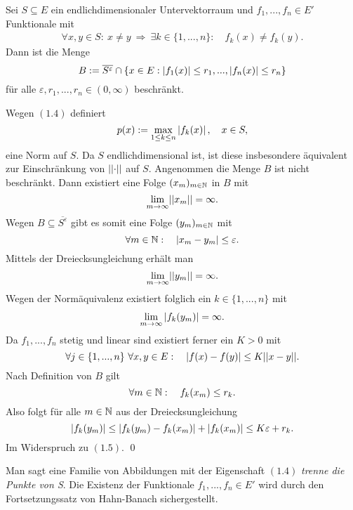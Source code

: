 \begin{lemma}
    Sei $S \subseteq E$ ein endlichdimensionaler Untervektorraum und $f_1,...,f_n \in E'$ Funktionale mit 
    \begin{align}
        \forall x,y \in S: \ x \neq y \ \Rightarrow \ \exists k \in \{1,...,n\}: \quad f_k(x) \neq f_k(y).
    \end{align}
    Dann ist die Menge 
    $$
        B := \overline{S^{\varepsilon}} \cap \{x \in E: \left| f_1(x) \right| \leq r_1,...,\left| f_n(x) \right|\leq r_n\}
    $$
    für alle $\varepsilon, r_1,...,r_n \in (0, \infty)$ beschränkt. 
\end{lemma}

\begin{proof*}
    Wegen $(1.4)$ definiert 
    $$
        p(x) := \max_{1\leq k \leq n} \left| f_k(x) \right|, \quad x \in S,
    $$
    eine Norm auf $S$. Da $S$ endlichdimensional ist, ist diese insbesondere äquivalent zur Einschränkung von $\lvert\lvert \cdot \rvert\rvert$ auf $S$. 
    Angenommen die Menge $B$ ist nicht beschränkt. Dann existiert eine Folge $(x_m)_{m \in \mathbb{N}}$ in $B$ mit 
    $$
        \lim_{m \to \infty} \lvert\lvert x_m \rvert\rvert = \infty. 
    $$
    Wegen $B \subseteq \overline{S^{\varepsilon}}$ gibt es somit eine Folge $(y_m)_{m \in \mathbb{N}}$ mit 
    $$
        \forall m \in \mathbb{N}: \quad \left| x_m - y_m \right| \leq \varepsilon. 
    $$
    Mittels der Dreiecksungleichung erhält man
    $$
        \lim_{m \to \infty}\lvert\lvert y_m \rvert\rvert = \infty. 
    $$
    Wegen der Normäquivalenz existiert folglich ein $k \in \{1,...,n\}$ mit 
    \begin{align}
        \lim_{m \to \infty}\left| f_k(y_m) \right| = \infty. 
    \end{align}
    Da $f_1,...,f_n$ stetig und linear sind existiert ferner ein $K > 0$ mit 
    $$
        \forall j \in \{1,...,n\} \ \forall x,y \in E: \quad \left| f(x)-f(y) \right| \leq K \lvert\lvert x-y \rvert\rvert. 
    $$
    Nach Definition von $B$ gilt 
    $$
        \forall m \in \mathbb{N}: \quad f_k(x_m) \leq r_k.
    $$
    Also folgt für alle $m \in \mathbb{N}$ aus der Dreiecksungleichung
    $$
        \left| f_k(y_m) \right| \leq \left| f_k(y_m) - f_k(x_m) \right| + \left| f_k(x_m) \right| \leq K \varepsilon + r_k. 
    $$
    Im Widerspruch zu $(1.5)$. \qed
\end{proof*}

\begin{remark}%
    Man sagt eine Familie von Abbildungen mit der Eigenschaft $(1.4)$ \textit{trenne die Punkte von S}.
    Die Existenz der Funktionale $f_1,...,f_n \in E'$ wird durch den Fortsetzungssatz von Hahn-Banach sichergestellt. 
\end{remark}

